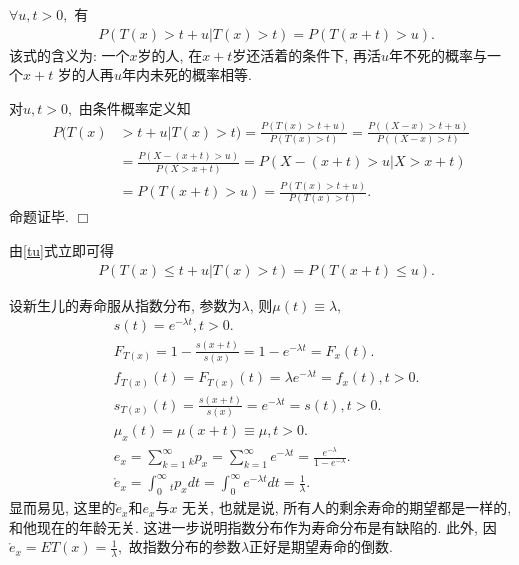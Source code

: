 \documentclass[a4paper,10pt]{ctexbook}
\def\qed{\hfill$\Box$\medskip}
\begin{document}
\begin{proposition}$\forall u,t>0,$ 有
    \begin{align}
         & P(T(x)>t+u|T(x)>t)=P(T(x+t)>u).\label{tu}
    \end{align}
    该式的含义为: 一个$x$岁的人, 在$x+t$岁还活着的条件下, 再活$u$年不死的概率与一个$x+t$ 岁的人再$u$年内未死的概率相等.
\end{proposition}

\proof 对$u,t>0,$ 由条件概率定义知
\begin{align*}
    P(T(x) & >t+u|T(x)>t)=\frac{P(T(x)>t+u)}{P(T(x)>t)}=\frac{P((X-x)>t+u)}{P((X-x)>t)} \\
           & =\frac{P(X-(x+t)>u)}{P(X>x+t)}=  P(X-(x+t)>u|X>x+t)                        \\
           & =P(T(x+t)>u)=\frac{P(T(x)>t+u)}{P(T(x)>t)}.
\end{align*}
命题证毕. \qed

\begin{remark}由\eqref{tu}式立即可得
    \begin{align}\label{tul}
         & P(T(x)\leq t+u|T(x)>t)=P(T(x+t)\leq u).
    \end{align}
\end{remark}
\begin{example}
    设新生儿的寿命服从指数分布, 参数为$\lambda$, 则$\mu(t)\equiv\lambda,$
    \begin{align*}
         & s(t)=e^{-\lambda t},t>0.                                                                                       \\
         & F_{T(x)}=1-\frac{s(x+t)}{s(x)}=1-e^{- \lambda t}=F_x(t).                                                       \\
         & f_{T(x)}(t)=F_{T(x)}(t)=\lambda e^{- \lambda t}=f_x(t),t>0.                                                    \\
         & s_{T(x)}(t)=\frac{s(x+t)}{s(x)}=e^{-\lambda t}=s(t),t>0.                                                       \\
         & \mu_x(t)=\mu(x+t)\equiv\mu,t>0.                                                                                \\
         & e_x = \sum_{k=1}^{\infty} {_kp_x}=\sum_{k=1}^{\infty} {e^{- \lambda t}}=\frac{e^{- \lambda}}{1-e^{- \lambda}}. \\
         & \mathring{e}_x=\int_{0}^{\infty}{_tp_x}dt=\int_{0}^{\infty}{e^{- \lambda t}}dt=\frac{1}{\lambda}.
    \end{align*}
    显而易见, 这里的$\mathring e_x $和$e_x$与$x$ 无关, 也就是说,  所有人的剩余寿命的期望都是一样的, 和他现在的年龄无关. 这进一步说明指数分布作为寿命分布是有缺陷的.   此外, 因$\mathring{e}_x=ET(x)=\frac{1}{\lambda},$ 故指数分布的参数$\lambda$正好是期望寿命的倒数.
\end{example}
\end{document}
